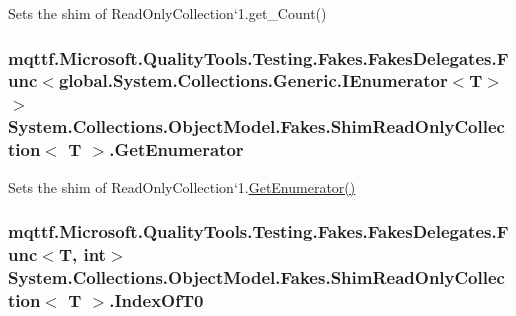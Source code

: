 Sets the shim of Read\-Only\-Collection`1.get\-\_\-\-Count()

\hypertarget{class_system_1_1_collections_1_1_object_model_1_1_fakes_1_1_shim_read_only_collection_3_01_t_01_4_a2947a3d4ce1a04c4c8a9086007ed147a}{
\subsubsection[{Get\-Enumerator}]{\setlength{\rightskip}{0pt plus 5cm}mqttf.\-Microsoft.\-Quality\-Tools.\-Testing.\-Fakes.\-Fakes\-Delegates.\-Func$<$global.\-System.\-Collections.\-Generic.\-I\-Enumerator$<$T$>$ $>$ System.\-Collections.\-Object\-Model.\-Fakes.\-Shim\-Read\-Only\-Collection$<$ T $>$.Get\-Enumerator\hspace{0.3cm}{\ttfamily [set]}}}\label{class_system_1_1_collections_1_1_object_model_1_1_fakes_1_1_shim_read_only_collection_3_01_t_01_4_a2947a3d4ce1a04c4c8a9086007ed147a}


Sets the shim of Read\-Only\-Collection`1.\hyperlink{class_system_1_1_collections_1_1_object_model_1_1_fakes_1_1_shim_read_only_collection_3_01_t_01_4_a2947a3d4ce1a04c4c8a9086007ed147a}{Get\-Enumerator()}

\hypertarget{class_system_1_1_collections_1_1_object_model_1_1_fakes_1_1_shim_read_only_collection_3_01_t_01_4_a8c9862452b4105a1daa2db91a6c15989}{
\subsubsection[{Index\-Of\-T0}]{\setlength{\rightskip}{0pt plus 5cm}mqttf.\-Microsoft.\-Quality\-Tools.\-Testing.\-Fakes.\-Fakes\-Delegates.\-Func$<$T, int$>$ System.\-Collections.\-Object\-Model.\-Fakes.\-Shim\-Read\-Only\-Collection$<$ T $>$.Index\-Of\-T0\hspace{0.3cm}{\ttfamily [set]}}}\label{class_system_1_1_collections_1_1_object_model_1_1_fakes_1_1_shim_read_only_collection_3_01_t_01_4_a8c9862452b4105a1daa2db91a6c15989}


